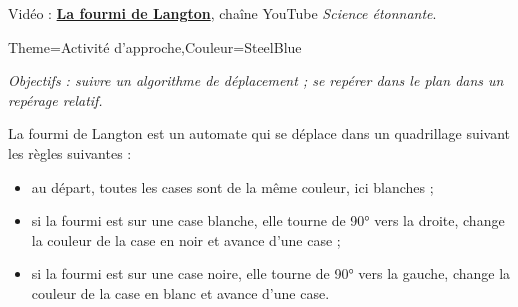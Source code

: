 \hfill {\gray Vidéo : \href{https://www.youtube.com/watch?v=qZRYGxF6D3w}{\bf La fourmi de Langton}, chaîne YouTube {\it Science étonnante}.}


\begin{Maquette}[Cours]{Theme={Activité d'approche},Couleur={SteelBlue}}


      {\it Objectifs : suivre un algorithme de déplacement ; se repérer dans le plan dans un repérage relatif.}

      \begin{AActivite}

            La fourmi de Langton est un automate qui se déplace dans un quadrillage suivant les règles suivantes :
            {\singlespacing
            \begin{itemize}
               \item au départ, toutes les cases sont de la même couleur, ici blanches ;
               \item si la fourmi est sur une case blanche, elle tourne de 90° vers la droite, change la couleur de la case en noir et avance d'une case ;
               \item si la fourmi est sur une case noire, elle tourne de 90° vers la gauche, change la couleur de la case en blanc et avance d'une case.
            \end{itemize}}


\end{AActivite}
\end{Maquette}

